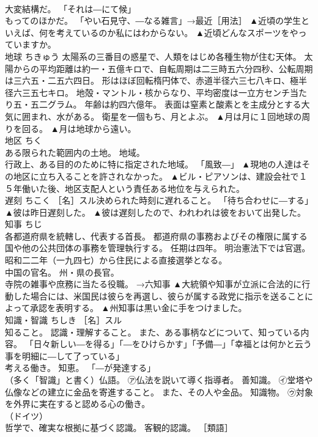 \documentclass[8pt]{extreport}
\begin{document}
\begin{CJK}{UTF8}{min}
\\	大変結構だ。 「それは―にて候」 
\\	もってのほかだ。 「やい石見守、―なる雑言」→最近［用法］	▲近頃の学生といえば、何を考えているのか私にはわからない。 ▲近頃どんなスポーツをやっていますか。
\\	地球	ちきゅう	太陽系の三番目の惑星で、人類をはじめ各種生物が住む天体。 太陽からの平均距離は約一・五億キロで、自転周期は二三時五六分四秒、公転周期は三六五・二五六四日。 形はほぼ回転楕円体で、赤道半径六三七八キロ、極半径六三五七キロ。 地殻・マントル・核からなり、平均密度は一立方センチ当たり五・五二グラム。 年齢は約四六億年。 表面は窒素と酸素とを主成分とする大気に囲まれ、水がある。 衛星を一個もち、月とよぶ。	▲月は月に１回地球の周りを回る。 ▲月は地球から遠い。
\\	地区	ちく	
\\	ある限られた範囲内の土地。 地域。 
\\	行政上、ある目的のために特に指定された地域。 「風致―」	▲現地の人達はその地区に立ち入ることを許されなかった。 ▲ビル・ピアソンは、建設会社で１５年働いた後、地区支配人という責任ある地位を与えられた。
\\	遅刻	ちこく	［名］スル決められた時刻に遅れること。 「待ち合わせに―する」	▲彼は昨日遅刻した。 ▲彼は遅刻したので、われわれは彼をおいて出発した。
\\	知事	ちじ	
\\	各都道府県を統轄し、代表する首長。 都道府県の事務およびその権限に属する国や他の公共団体の事務を管理執行する。 任期は四年。 明治憲法下では官選。 昭和二二年（一九四七）から住民による直接選挙となる。 
\\	中国の官名。 州・県の長官。 
\\	寺院の雑事や庶務に当たる役職。 →六知事	▲大統領や知事が立派に合法的に行動した場合には、米国民は彼らを再選し、彼らが属する政党に指示を送ることによって承認を表明する。 ▲州知事は黒い金に手をつけました。
\\	知識・智識	ちしき	［名］スル 
\\	知ること。 認識・理解すること。 また、ある事柄などについて、知っている内容。 「日々新しい―を得る」「―をひけらかす」「予備―」「幸福とは何かと云う事を明細に―して了っている」 
\\	考える働き。 知恵。 「―が発達する」 
\\	（多く「智識」と書く）仏語。 ㋐仏法を説いて導く指導者。 善知識。 ㋑堂塔や仏像などの建立に金品を寄進すること。 また、その人や金品。 知識物。 ㋒対象を外界に実在すると認める心の働き。 
\\	（ドイツ）
\\	哲学で、確実な根拠に基づく認識。 客観的認識。 ［類語］

\end{CJK}
\end{document}
